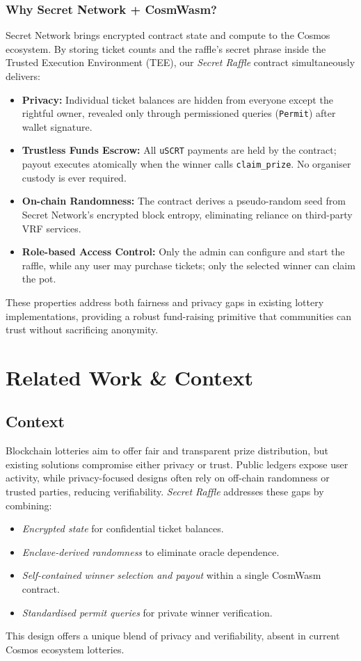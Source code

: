 \documentclass{article}
\begin{document}
\subsubsection{Why Secret Network + CosmWasm?}
Secret Network brings encrypted contract state and compute to the Cosmos ecosystem. By storing ticket counts and the raffle's secret phrase inside the Trusted Execution Environment (TEE), our \emph{Secret Raffle} contract simultaneously delivers:
\begin{itemize}
  \item \textbf{Privacy:} Individual ticket balances are hidden from everyone except the rightful owner, revealed only through permissioned queries (\texttt{Permit}) after wallet signature.
  \item \textbf{Trustless Funds Escrow:} All \texttt{uSCRT} payments are held by the contract; payout executes atomically when the winner calls \texttt{claim\_prize}. No organiser custody is ever required.
  \item \textbf{On-chain Randomness:} The contract derives a pseudo-random seed from Secret Network's encrypted block entropy, eliminating reliance on third-party VRF services.
  \item \textbf{Role-based Access Control:} Only the admin can configure and start the raffle, while any user may purchase tickets; only the selected winner can claim the pot.
\end{itemize}
These properties address both fairness and privacy gaps in existing lottery implementations, providing a robust fund-raising primitive that communities can trust without sacrificing anonymity.

\section{Related Work \& Context}

\subsection{Context}
Blockchain lotteries aim to offer fair and transparent prize distribution, but existing solutions compromise either privacy or trust. Public ledgers expose user activity, while privacy-focused designs often rely on off-chain randomness or trusted parties, reducing verifiability. \emph{Secret Raffle} addresses these gaps by combining:
\begin{itemize}
  \item \emph{Encrypted state} for confidential ticket balances.
  \item \emph{Enclave-derived randomness} to eliminate oracle dependence.
  \item \emph{Self-contained winner selection and payout} within a single CosmWasm contract.
  \item \emph{Standardised permit queries} for private winner verification.
\end{itemize}
This design offers a unique blend of privacy and verifiability, absent in current Cosmos ecosystem lotteries.
\end{document}

